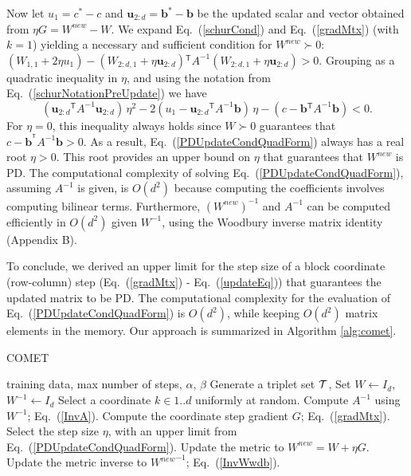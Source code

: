 \documentclass{article} %
\newcommand\mat[1]{{#1}}
\renewcommand\vec[1]{\mathbf{#1}}
\newcommand{\T}{{}^\mathsf{T}}
\newcommand{\W}{\mat{W}}
\newcommand{\newW}{{\mat{W^{new}}}}
\newcommand{\B}{\vec{b}}
\newcommand{\C}{c}
\newcommand{\invA}{A^{-1}}
\newcommand{\uscalar}{{u}_{1}}
\newcommand{\uvec}{\vec{u}_{2:d}}
\newcommand{\Wvec}{\W_{2:d,1}}
\newcommand{\Wscalar}{\W_{1,1}}
\renewcommand{\eqref}[1]{Eq.~(\ref{#1})}
\begin{document}
%
Now let $\uscalar = \C^* - \C$ and $\uvec = \B^* - \B$ be the updated scalar and vector
obtained from $\eta G = \newW - \W$. We expand \eqref{schurCond} and
\eqref{gradMtx} (with $k=1$) yielding a necessary and sufficient condition for $\newW \succ 0$: $(\Wscalar + 2\eta \uscalar)-(\Wvec + \eta \uvec)\T \invA (\Wvec + \eta \uvec)   > 0$.
Grouping as a quadratic inequality in $\eta$, and using the notation from \eqref{schurNotationPreUpdate} we have
\begin{equation}
\label{PDUpdateCondQuadForm}
(\uvec\T \invA \uvec) \, \eta^2 
-2(\uscalar - \uvec\T \invA \B) \,\eta 
-(\C - \B\T  \invA \B) < 0 .
\end{equation}
For $\eta = 0$, this inequality always
holds since $\W \succ 0$ guarantees that $\C-\B^{\T} \invA \B >0$. As a result,
 \eqref{PDUpdateCondQuadForm} always has a real
root $\eta > 0$. This root provides an upper bound on $\eta$ that guarantees that $\newW$ is PD. The computational complexity of solving \eqref{PDUpdateCondQuadForm}, assuming $\invA$ is given, is $O(d^2)$ because computing the coefficients involves computing bilinear terms.
Furthermore, $(\newW)^{-1}$ and $\invA$ can be computed efficiently in $O(d^2)$ given $\W^{-1}$, using the Woodbury inverse matrix identity (Appendix B).

To conclude, we derived an upper limit for the step size of a block coordinate (row-column) step (\eqref{gradMtx} - \eqref{updateEq}) that guarantees  the updated matrix to be PD. The computational complexity for the evaluation
of \eqref{PDUpdateCondQuadForm} is $O(d^2)$, while keeping $O(d^2)$ matrix elements in the memory.
Our approach is summarized in Algorithm \ref{alg:comet}.

\begin{algorithm}[tb]
   \caption{COMET}
   \label{alg:comet}
\begin{algorithmic}[1]
    training data, max number of steps, $\alpha$, $\beta$
   \STATE Generate a triplet set $\cal{T}$, Set  $\W  \leftarrow I_d$, $\W^{-1}  \leftarrow I_d$
   \REPEAT 
   \STATE Select a coordinate $k \in {1..d}$ uniformly at random.
   \STATE Compute $\invA$ using $\W^{-1}$; \eqref{InvA}.
   \STATE Compute the coordinate step gradient $G$; \eqref{gradMtx}.
   \STATE Select the step size $\eta$, with an upper limit from \eqref{PDUpdateCondQuadForm}.
   \STATE Update the metric to $\newW=\W+\eta G$.
   \STATE Update the metric inverse to $\newW^{-1}$; \eqref{InvWwdb}.
\end{algorithmic}
\end{algorithm}
\end{document}
